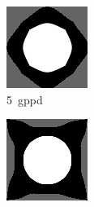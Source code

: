 \newpage
\begin{figure}[ht]
  \caption{Bilder der deformierbaren Registrierung}
  \label{pic:deform}
  \begin{subfigure}{0.32\linewidth}
    \centering
    \includegraphics[width=\linewidth]{images/A4_5gppd.png}
    \caption{\SI{5}{gppd}}
  \end{subfigure}
  \hfill
  \begin{subfigure}{0.32\linewidth}
    \centering
    \includegraphics[width=\linewidth]{images/A4_10gppd.png}

\end{subfigure}
\end{figure}
